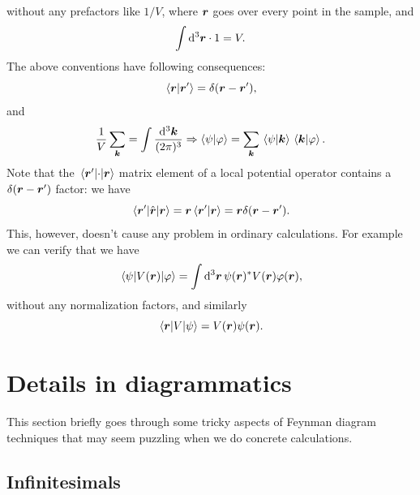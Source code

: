 \documentclass[hyperref, a4paper, 12pt]{report}
\begin{document}
without any prefactors like $1/V$,
where $\vb*{r}$ goes over every point in the sample, and 
\begin{equation}
    \int \dd[3]{\vb*{r}} \cdot 1 = V.   
\end{equation} 
The above conventions have following consequences:
\begin{equation}
    \braket*{\vb*{r}}{\vb*{r}'} = \delta(\vb*{r} - \vb*{r}'),
\end{equation}
and 
\begin{equation}
    \frac{1}{V} \sum_{\vb*{k}} = \int \frac{\dd[3]{\vb*{k}}}{(2\pi)^3} 
    \Rightarrow \braket{\psi}{\varphi} = \sum_{\vb*{k}} \braket*{\psi}{\vb*{k}} \braket*{\vb*{k}}{\varphi}.
\end{equation}
Note that the $\mel*{\vb*{r}'}{\cdot}{\vb*{r}}$ matrix element of a local potential operator 
contains a $\delta(\vb*{r} - \vb*{r}')$ factor:
we have
\[
    \mel*{\vb*{r}'}{\hat{\vb*{r}}}{\vb*{r}} = \vb*{r} \braket*{\vb*{r}'}{\vb*{r}} = \vb*{r} \delta(\vb*{r} - \vb*{r}').
\] 
This, however, doesn't cause any problem in ordinary calculations.
For example we can verify that we have
\[
    \mel*{\psi}{V(\vb*{r})}{\varphi} = \int \dd[3]{\vb*{r}} \psi(\vb*{r})^* V(\vb*{r}) \varphi(\vb*{r}),
\]
without any normalization factors, and similarly 
\[
    \mel*{\vb*{r}}{V}{\psi} = V(\vb*{r}) \psi(\vb*{r}).
\]

\section{Details in diagrammatics}\label{sec:details-in-diagram}

This section briefly goes through some tricky aspects of Feynman diagram techniques 
that may seem puzzling when we do concrete calculations.

\subsection{Infinitesimals}\label{sec:cond.infinitesimal}
\end{document}
